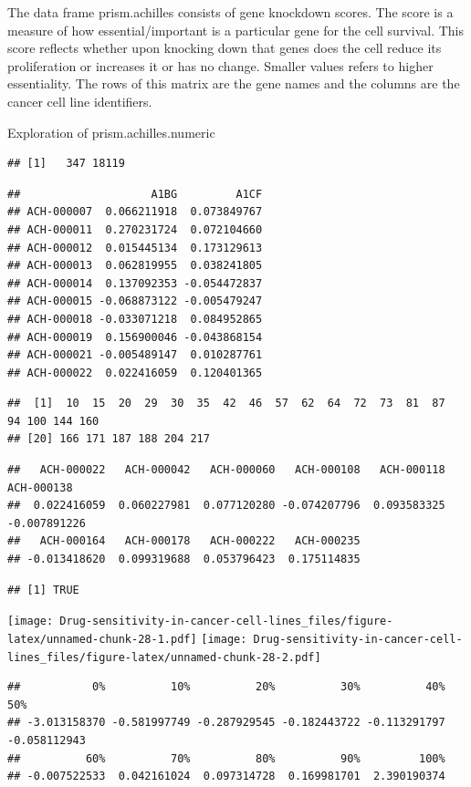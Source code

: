 \documentclass[
]{article}
\begin{document}
The data frame prism.achilles consists of gene knockdown scores. The
score is a measure of how essential/important is a particular gene for
the cell survival. This score reflects whether upon knocking down that
genes does the cell reduce its proliferation or increases it or has no
change. Smaller values refers to higher essentiality. The rows of this
matrix are the gene names and the columns are the cancer cell line
identifiers.

Exploration of prism.achilles.numeric

\begin{verbatim}
## [1]   347 18119
\end{verbatim}

\begin{verbatim}
##                    A1BG         A1CF
## ACH-000007  0.066211918  0.073849767
## ACH-000011  0.270231724  0.072104660
## ACH-000012  0.015445134  0.173129613
## ACH-000013  0.062819955  0.038241805
## ACH-000014  0.137092353 -0.054472837
## ACH-000015 -0.068873122 -0.005479247
## ACH-000018 -0.033071218  0.084952865
## ACH-000019  0.156900046 -0.043868154
## ACH-000021 -0.005489147  0.010287761
## ACH-000022  0.022416059  0.120401365
\end{verbatim}

\begin{verbatim}
##  [1]  10  15  20  29  30  35  42  46  57  62  64  72  73  81  87  94 100 144 160
## [20] 166 171 187 188 204 217
\end{verbatim}

\begin{verbatim}
##   ACH-000022   ACH-000042   ACH-000060   ACH-000108   ACH-000118   ACH-000138 
##  0.022416059  0.060227981  0.077120280 -0.074207796  0.093583325 -0.007891226 
##   ACH-000164   ACH-000178   ACH-000222   ACH-000235 
## -0.013418620  0.099319688  0.053796423  0.175114835
\end{verbatim}

\begin{verbatim}
## [1] TRUE
\end{verbatim}

\texttt{[image: Drug-sensitivity-in-cancer-cell-lines\_files/figure-latex/unnamed-chunk-28-1.pdf]}
\texttt{[image: Drug-sensitivity-in-cancer-cell-lines\_files/figure-latex/unnamed-chunk-28-2.pdf]}

\begin{verbatim}
##           0%          10%          20%          30%          40%          50% 
## -3.013158370 -0.581997749 -0.287929545 -0.182443722 -0.113291797 -0.058112943 
##          60%          70%          80%          90%         100% 
## -0.007522533  0.042161024  0.097314728  0.169981701  2.390190374
\end{verbatim}
\end{document}
